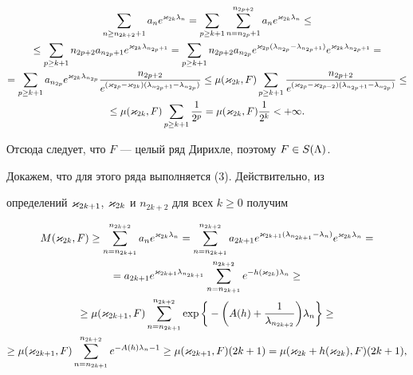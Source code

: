 \begin{gather*}


\sum_{n\ge n_{2k+2}+1}a_ne^{\k_{2k}\l_n}=\sum_{p\ge


k+1}\sum_{n=n_{2p}+1}^{n_{2p+2}}a_ne^{\k_{2k}\l_n}\le\\ 


%


\le\sum_{p\ge k+1}n_{2p+2}a_{n_{2p}+1}e^{\k_{2k}\l_{n_{2p}+1}}=


\sum_{p\ge k+1}n_{2p+2}a_{n_{2p}}


e^{\k_{2p}(\l_{n_{2p}}-\l_{n_{2p}+1})}e^{\k_{2k}\l_{n_{2p}+1}}=\\


%


=\sum_{p\ge k+1}a_{n_{2p}}e^{\k_{2k}


\l_{n_{2p}}}\frac{n_{2p+2}}{e^{(\k_{2p}-\k_{2k})


(\l_{n_{2p}+1}-\l_{n_{2p}})}}\le


\mu(\k_{2k},F)\sum_{p\ge


k+1}\frac{n_{2p+2}}{e^{(\k_{2p}-\k_{2p-2})(\l_{n_{2p}+1}-\l_{n_{2p}})}}\le\\


\le\mu(\k_{2k},F)\sum_{p\ge


k+1}\frac1{2^p}=\mu(\k_{2k},F)\frac1{2^k}<+\i.


\end{gather*}


Отсюда следует, что $F$ --- целый ряд Дирихле, поэтому $F\in S(\Lambda)$.





Докажем, что для этого ряда выполняется (3). Действительно, из


определений $\varkappa_{2k+1}$, $\varkappa_{2k}$ и $n_{2k+2}$ для всех $k\ge 0$ получим


\begin{gather*}


M(\k_{2k},F)\ge \sum_{n=n_{2k+1}}^{n_{2k+2}}a_ne^{\k_{2k}\l_n}=


\sum_{n=n_{2k+1}}^{n_{2k+2}}


a_{2k+1}e^{\k_{2k+1}(\l_{n_{2k+1}}-\l_n)} 


e^{\k_{2k}\l_n}=\\


%


=a_{2k+1}e^{\k_{2k+1}\l_{n_{2k+1}}}


\sum_{n=n_{2k+1}}^{n_{2k+2}}e^{-h(\k_{2k})\l_n}\ge\\


%


\ge\mu(\k_{2k+1},F)\sum_{n=n_{2k+1}}^{n_{2k+2}}


\exp\bigg\{-\bigg(A(h)+\frac1{\l_{n_{2k+2}}}\bigg)\l_n\bigg\}\ge\\


%


\ge


\mu(\k_{2k+1},F)\sum_{n=n_{2k+1}}^{n_{2k+2}}


e^{-A(h)\l_n-1}\ge \mu(\k_{2k+1},F)(2k+1)=


\mu(\k_{2k}+h(\k_{2k}),F)(2k+1),


\end{gather*}


